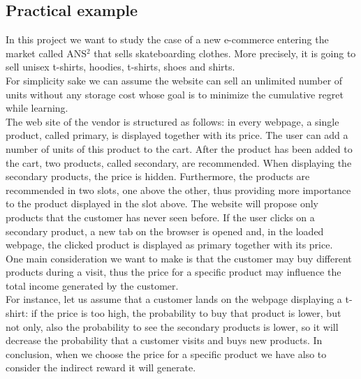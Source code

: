 \subsection*{Practical example}
In this project we want to study the case of a new e-commerce entering the market called ANS$^2$ that sells skateboarding clothes. More precisely, it is going to sell unisex t-shirts, hoodies, t-shirts, shoes and shirts.\\ For simplicity sake we can assume the website can sell an unlimited number of units without any storage cost whose goal is to minimize the cumulative regret while learning.\\
The web site of the vendor is structured as follows: in every webpage, a single product, called primary, is displayed together with its price. The user can add a number of units of this product to the cart. After the product has been added to the cart, two products, called secondary, are recommended. When displaying the secondary products, the price is hidden. Furthermore, the products are recommended in two slots, one above the other, thus providing more importance to the product displayed in the slot above. The website will propose only products that the customer has never seen before.
If the user clicks on a secondary product, a new tab on the browser is opened and, in the loaded webpage, the clicked product is displayed as primary together with its price.\\
One main consideration we want to make is that the customer may buy different products during a visit, thus the price for a specific product may influence the total income generated by the customer.\\ For instance, let us assume that a customer lands on the webpage displaying a t-shirt: if the price is too high, the probability to buy that product is lower, but not only, also the probability to see the secondary products is lower, so it will decrease the probability that a customer visits and buys new products. In conclusion, when we choose the price for a specific product we have also to consider the indirect reward it will generate.